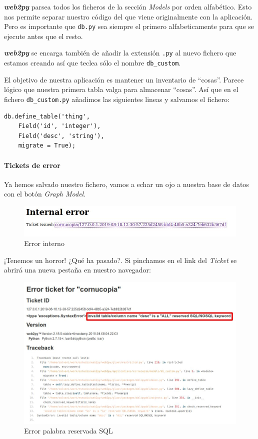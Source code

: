 \documentclass[
  12pt,
  spanish,
]{article}
\begin{document}
\textbf{\emph{web2py}} parsea todos los ficheros de la sección
\emph{Models} por orden alfabético. Esto nos permite separar nuestro
código del que viene originalmente con la aplicación. Pero es importante
que \texttt{db.py} sea siempre el primero alfabeticamente para que se
ejecute antes que el resto.

\textbf{\emph{web2py}} se encarga también de añadir la extensión
\texttt{.py} al nuevo fichero que estamos creando así que teclea sólo el
nombre \texttt{db\_custom}.

El objetivo de nuestra aplicación es mantener un inventario de
``cosas''. Parece lógico que nuestra primera tabla valga para almacenar
``cosas''. Así que en el fichero \texttt{db\_custom.py} añadimos las
siguientes lineas y salvamos el fichero:

\begin{verbatim}
db.define_table('thing',
    Field('id', 'integer'),
    Field('desc', 'string'),
    migrate = True);
\end{verbatim}

\hypertarget{tickets-de-error}{%
\paragraph{Tickets de error}\label{tickets-de-error}}

Ya hemos salvado nuestro fichero, vamos a echar un ojo a nuestra base de
datos con el botón \emph{Graph Model}.

\begin{figure}
\centering
\includegraphics{src/img/internal_error.jpg}
\caption{Error interno}
\end{figure}

¡Tenemos un horror! ¿Qué ha pasado?. Si pinchamos en el link del
\emph{Ticket} se abrirá una nueva pestaña en nuestro navegador:

\begin{figure}
\centering
\includegraphics{src/img/error_reserved_sql.jpg}
\caption{Error palabra reservada SQL}
\end{figure}
\end{document}

